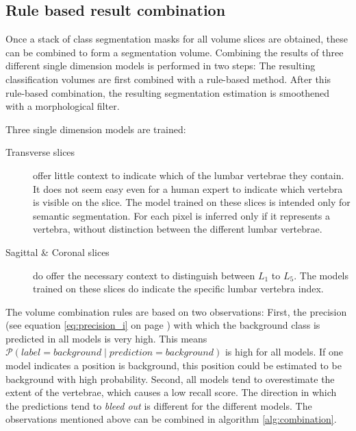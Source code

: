 \subsection{Rule based result combination}
\par{
Once a stack of class segmentation masks for all volume slices are obtained, these can be combined to form a segmentation volume.
Combining the results of three different single dimension models is performed in two steps:
The resulting classification volumes are first combined with a rule-based method.
After this rule-based combination, the resulting segmentation estimation is smoothened with a morphological filter.
}


Three single dimension models are trained:
\begin{description}
    \item[Transverse slices] offer little context to indicate which of the lumbar vertebrae they contain. 
    It does not seem easy even for a human expert to indicate which vertebra is visible on the slice.
    The model trained on these slices is intended only for semantic segmentation.
    For each pixel is inferred only if it represents a vertebra, without distinction between the different lumbar vertebrae. 
    \item[Sagittal \& Coronal slices] do offer the necessary context to distinguish between $L_1$ to $L_5$. 
    The models trained on these slices do indicate the specific lumbar vertebra index. 
\end{description}

\par{
The volume combination rules are based on two observations:
First, the precision (see equation \ref{eq:precision_i} on page \pageref{eq:precision_i}) with which the background class is predicted in all models is very high.\newline
            This means $\mathcal{P} \left( label = background \mid prediction = background \right)$ is high for all models. 
            If one model indicates a position is background, this position could be estimated to be background with high probability.
Second, all models tend to overestimate the extent of the vertebrae, which causes a low recall score. The direction in which the predictions tend to \textit{bleed out} is different for the different models. 
The observations mentioned above can be combined in algorithm \ref{alg:combination}.
}


